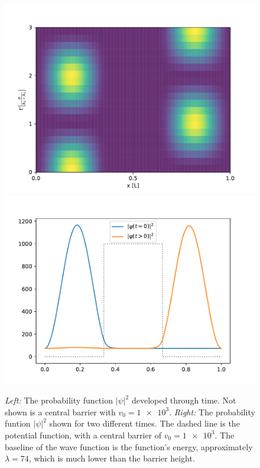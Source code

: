\documentclass[a4paper, 11pt]{article}
\begin{document}
\begin{figure}[ht]
\centering
\includegraphics[width=.45\textwidth]{media/bouncy_state}
\includegraphics[width=.45\textwidth]{media/tunneling_line}
\caption{\emph{Left:} The probability function $|\psi|^2$ developed through time. Not shown is a central barrier with $v_0 = \num{1e3}$.
  \emph{Right:} The probability funtion $|\psi|^2$ shown for two different times. The dashed line is the potential function, with a central barrier of $v_0 = \num{1e3}$.
  The baseline of the wave function is the function's energy, approximately $\lambda = 74$, which is much lower than the barrier height.
  \label{fig:bouncy_state}}
\end{figure}

\end{document}
